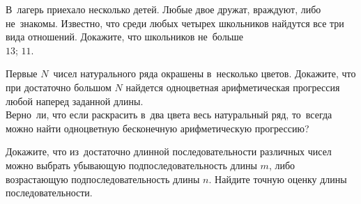 


\begin{problems}

\item
В~лагерь приехало несколько детей.
Любые двое дружат, враждуют, либо не~знакомы.
Известно, что среди любых четырех школьников найдутся все три вида отношений.
Докажите, что школьников не~больше
\\
\subproblem $13$;
\quad
\subproblem $11$.

\item
\subproblem{}
Первые $N$~чисел натурального ряда окрашены в~несколько цветов.
Докажите, что при достаточно большом $N$ найдется одноцветная арифметическая
прогрессия любой наперед заданной длины.
\\
\subproblem
Верно~ли, что если раскрасить в~два цвета весь натуральный ряд, то~всегда можно
найти одноцветную бесконечную арифметическую прогрессию?

\item
Докажите, что из~достаточно длинной последовательности различных чисел можно
выбрать убывающую подпоследовательность длины $m$, либо возрастающую
подпоследовательность длины $n$.
Найдите точную оценку длины последовательности.

\end{problems}

